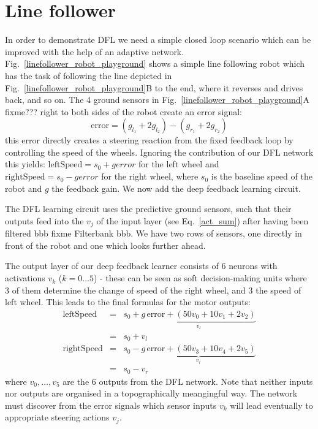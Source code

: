 \documentclass{llncs}
\begin{document}
\section{Line follower}
In order to demonstrate DFL we need a simple closed loop scenario which can be
improved with the help of an adaptive network. 
Fig.~\ref{linefollower_robot_playground} shows a simple line following robot which has the task of following the line depicted in
Fig.~\ref{linefollower_robot_playground}B to the end, where it reverses and drives back, and so on. The 4 ground sensors
in Fig.~\ref{linefollower_robot_playground}A fixme??? right to both sides of the robot create
an error signal:
\begin{equation}
\mathrm{error} = (g_{l_1}+2 g_{l_2})-(g_{r_1}+2 g_{r_2}) \label{line_error}
\end{equation}
this error directly creates a steering reaction from the fixed feedback loop by controlling the speed of the wheels. Ignoring the contribution of our DFL network this yields: $\mathrm{leftSpeed} = s_0 + g error$ for the
left wheel and $\mathrm{rightSpeed} = s_0 - g error$ for the right wheel,
where $s_0$ is the baseline speed of the robot and $g$ the feedback gain. We now
add the deep feedback learning circuit. 

The DFL learning circuit uses the predictive ground sensors, such that their outputs feed into the $v_j$ of
the input layer (see Eq.~\ref{act_sum}) after having been filtered bbb
fixme Filterbank bbb. We have two rows of sensors, one directly in front of the robot and one which looks further ahead.

The output layer of our deep feedback learner consists of 6 neurons with activations
$v_k$ ($k=0 \ldots 5$) 
- these can be seen as soft
decision-making units where 3 of them determine the change of speed of
the right wheel, and 3 the speed of left wheel. This leads to the final formulas for the motor outputs:
\begin{eqnarray}
  \mathrm{leftSpeed} &=& s_0 + \underbrace{g\, \mathrm{error} + \left( 50 v_0 + 10 v_1 + 2 v_2 \right)}_{v_l} \\
                     &=& s_0 + v_l \\
  \mathrm{rightSpeed} &=& s_0 - \underbrace{g\, \mathrm{error} + \left( 50 v_3 + 10 v_4 + 2 v_5 \right)}_{v_r} \\
                     &=& s_0 - v_r
\end{eqnarray}
where $v_0, \ldots, v_5$ are the 6 outputs from the DFL network.
Note that neither inputs nor outputs are organised in a topographically
meangingful way. The network must discover from the error signals
which sensor inputs $v_k$ will lead eventually to appropriate steering actions $v_j$.
\end{document}
